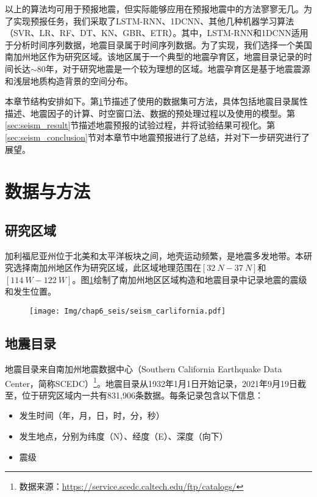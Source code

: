 以上的算法均可用于预报地震，但实际能够应用在预报地震中的方法寥寥无几。为了实现预报任务，我们采取了LSTM-RNN\citep{Wang2017Earthquake,Bhatia2018EARTHQUAKE,berhich2020lstm}、1DCNN、其他几种机器学习算法（SVR、LR、RF、DT、KN、GBR、ETR）。其中，LSTM-RNN和1DCNN适用于分析时间序列数据，地震目录属于时间序列数据\citep{Morales2010Pattern,Werner2009High}。为了实现，我们选择一个美国南加州地区作为研究区域。该地区属于一个典型的地震孕育区，地震目录记录的时间长达$\sim$80年，对于研究地震是一个较为理想的区域。地震孕育区是基于地震震源和浅层地质构造背景的空间分布。

本章节结构安排如下。第\ref{sec:seism_data_method}节描述了使用的数据集可方法，具体包括地震目录属性描述、地震因子的计算、时空窗口法、数据的预处理过程以及使用的模型。第\ref{sec:seism_result}节描述地震预报的试验过程，并将试验结果可视化。第\ref{sec:seism_conclusion}节对本章节中地震预报进行了总结，并对下一步研究进行了展望。

\section{数据与方法}\label{sec:seism_data_method}

\subsection{研究区域}\label{sec:seism_area}

加利福尼亚州位于北美和太平洋板块之间，地壳运动频繁，是地震多发地带。本研究选择南加州地区作为研究区域，此区域地理范围在$[\SI{32}{N}-\SI{37}{N}]$和$[\SI{114}{W}-\SI{122}{W}]$。图\ref{fig:seism_california}绘制了南加州地区区域构造和地震目录中记录地震的震级和发生位置。

\begin{figure}[!htbp]
  \centering
  \texttt{[image: Img/chap6\_seis/seism\_carlifornia.pdf]}
  \label{fig:seism_california}
\end{figure}

\subsection{地震目录}\label{sec:seism_catolog}

地震目录来自南加州地震数据中心（Southern California Earthquake Data Center，简称SCEDC）\footnote{数据来源：\href{https://service.scedc.caltech.edu/ftp/catalogs/}{https://service.scedc.caltech.edu/ftp/catalogs/}}。地震目录从1932年1月1日开始记录，2021年9月19日截至，位于研究区域内一共有831,906条数据。每条记录包含以下信息：
\begin{itemize}
  \item[1] 发生时间（年，月，日，时，分，秒）
  \item[2] 发生地点，分别为纬度（N）、经度（E）、深度（向下）
  \item[3] 震级
\end{itemize}

